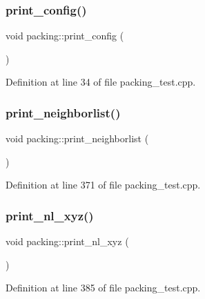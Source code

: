 \mbox{\label{classpacking_aafb35d8f7a0901ecaad05d3ea0e8ccf8}} 
\subsubsection{\texorpdfstring{print\+\_\+config()}{print\_config()}}
{\footnotesize\ttfamily void packing\+::print\+\_\+config (\begin{DoxyParamCaption}{ }\end{DoxyParamCaption})}



Definition at line 34 of file packing\+\_\+test.\+cpp.

\mbox{\label{classpacking_aec21a0ddfaaa3153f016ee91901b0197}} 
\subsubsection{\texorpdfstring{print\+\_\+neighborlist()}{print\_neighborlist()}}
{\footnotesize\ttfamily void packing\+::print\+\_\+neighborlist (\begin{DoxyParamCaption}{ }\end{DoxyParamCaption})}



Definition at line 371 of file packing\+\_\+test.\+cpp.

\mbox{\label{classpacking_a2b2c2908beb3d2577c01d4db73e7e2c1}} 
\subsubsection{\texorpdfstring{print\+\_\+nl\+\_\+xyz()}{print\_nl\_xyz()}}
{\footnotesize\ttfamily void packing\+::print\+\_\+nl\+\_\+xyz (\begin{DoxyParamCaption}{ }\end{DoxyParamCaption})}



Definition at line 385 of file packing\+\_\+test.\+cpp.

